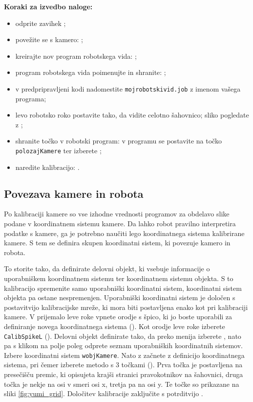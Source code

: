 \begin{mdframed}[backgroundcolor=yellow!20, shadow=true,roundcorner=8pt]
	\textbf{Koraki za izvedbo naloge:}
	\begin{itemize}
		\item odprite zavihek ;
		\item povežite se s kamero: ;
		\item kreirajte nov program robotskega vida: ;
		\item program robotskega vida poimenujte in shranite: ;
		\item v predpripravljeni kodi nadomestite \verb"mojrobotskivid.job" z imenom vašega programa;
		\item levo robotsko roko postavite tako, da vidite celotno šahovnico; sliko pogledate z ;
		\item shranite točko v robotski program: v programu se postavite na točko \verb"polozajKamere" ter izberete ;
		\item naredite kalibracijo: .
	\end{itemize}
\end{mdframed}


\subsection{Povezava kamere in robota}


Po kalibraciji kamere so vse izhodne vrednosti programov za obdelavo slike podane v koordinatnem sistemu kamere. Da lahko robot pravilno interpretira podatke s kamere, ga je potrebno naučiti lego koordinatnega sistema kalibrirane kamere. S tem se definira skupen koordinatni sistem, ki povezuje kamero in robota.

To storite tako, da definirate delovni objekt, ki vsebuje informacije o uporabniškem koordinatnem sistemu ter koordinatnem sistemu objekta. S to kalibracijo spremenite samo uporabniški koordinatni sistem, koordinatni sistem objekta pa ostane nespremenjen. Uporabniški koordinatni sistem je določen s postavitvijo kalibracijske mreže, ki mora biti postavljena enako kot pri kalibraciji kamere. V prijemalo leve roke vpnete orodje s špico, ki jo boste uporabili za definiranje novega koordinatnega sistema (). Kot orodje leve roke izberete \verb"CalibSpikeL" (). Delovni objekt definirate tako, da preko menija  izberete , nato pa s klikom na polje poleg  odprete seznam uporabniških koordinatnih sistemov. Izbere koordinatni sistem \verb"wobjKamere". Nato z  začnete z definicijo koordinatnega sistema, pri čemer izberete metodo s 3 točkami (). Prva točka je postavljena na presečišču premic, ki opisujeta krajši stranici pravokotnikov na šahovnici, druga točka je nekje na osi v smeri osi x, tretja pa na osi y. Te točke so prikazane na sliki \ref{fig:yumi_grid}. Določitev kalibracije zaključite s potrditvijo .


